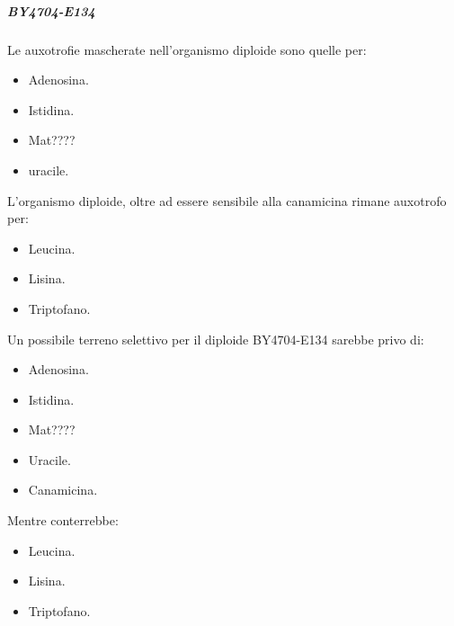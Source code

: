 				\subparagraph*{BY4704-E134}
				Le auxotrofie mascherate nell'organismo diploide sono quelle per:
				\begin{multicols}{2}
					\begin{itemize}
						\item Adenosina.
						\item Istidina.
						\item Mat????
						\item uracile.
					\end{itemize}
				\end{multicols}
				L'organismo diploide, oltre ad essere sensibile alla canamicina rimane auxotrofo per:
				\begin{multicols}{2}
					\begin{itemize}
						\item Leucina.
						\item Lisina.
						\item Triptofano.
					\end{itemize}
				\end{multicols}
				Un possibile terreno selettivo per il diploide BY4704-E134 sarebbe privo di:
				\begin{multicols}{2}
					\begin{itemize}
						\item Adenosina.
						\item Istidina.
						\item Mat????
						\item Uracile.
						\item Canamicina.
					\end{itemize}
				\end{multicols}
				Mentre conterrebbe:
				\begin{multicols}{2}
					\begin{itemize}
						\item Leucina.
						\item Lisina.
						\item Triptofano.
					\end{itemize}
				\end{multicols}

